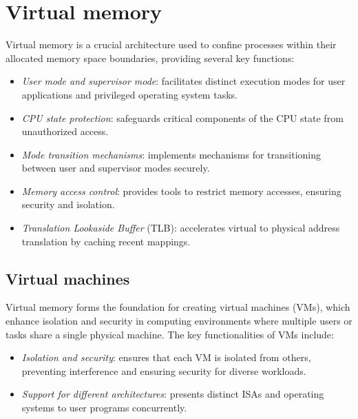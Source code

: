 \section{Virtual memory}

Virtual memory is a crucial architecture used to confine processes within their allocated memory space boundaries, providing several key functions:
\begin{itemize}
    \item \textit{User mode and supervisor mode}: facilitates distinct execution modes for user applications and privileged operating system tasks.
    \item \textit{CPU state protection}: safeguards critical components of the CPU state from unauthorized access.
    \item \textit{Mode transition mechanisms}: implements mechanisms for transitioning between user and supervisor modes securely.
    \item \textit{Memory access control}: provides tools to restrict memory accesses, ensuring security and isolation.
    \item \textit{Translation Lookaside Buffer} (TLB): accelerates virtual to physical address translation by caching recent mappings.
\end{itemize}

\subsection{Virtual machines}
Virtual memory forms the foundation for creating virtual machines (VMs), which enhance isolation and security in computing environments where multiple users or tasks share a single physical machine. 
The key functionalities of VMs include:
\begin{itemize}
    \item \textit{Isolation and security}: ensures that each VM is isolated from others, preventing interference and ensuring security for diverse workloads.
    \item \textit{Support for different architectures}: presents distinct ISAs and operating systems to user programs concurrently.
\end{itemize}

